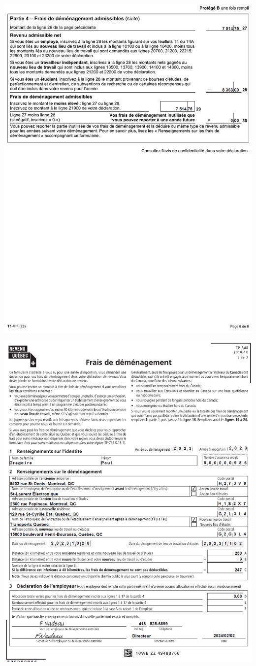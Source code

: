 \noindent
\includegraphics[height=\textheight]{exercice/3-5/Q5/T1-M-p6.png}

\noindent
\includegraphics[height=\textheight]{exercice/3-5/Q5/TP-348-p1.png}

